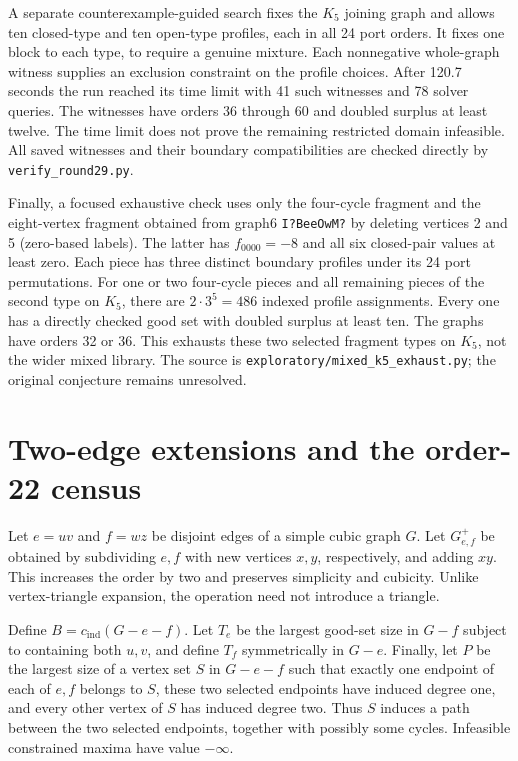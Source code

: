 \documentclass[11pt]{article}
\newcommand{\cind}{c_{\mathrm{ind}}}
\begin{document}
A separate counterexample-guided search fixes the $K_5$ joining
graph and allows ten closed-type and ten open-type profiles, each
in all 24 port orders. It fixes one block to each type, to require
a genuine mixture. Each nonnegative whole-graph witness supplies
an exclusion constraint on the profile choices. After 120.7 seconds
the run reached its time limit with 41 such witnesses and 78 solver
queries. The witnesses have orders 36 through 60 and doubled
surplus at least twelve. The time limit does not prove the remaining
restricted domain infeasible. All saved witnesses and their boundary
compatibilities are checked directly by \texttt{verify\_round29.py}.

Finally, a focused exhaustive check uses only the four-cycle fragment
and the eight-vertex fragment obtained from graph6
\texttt{I?BeeOwM?} by deleting vertices 2 and 5 (zero-based labels).
The latter has $f_{0000}=-8$ and all six closed-pair values at least
zero. Each piece has three distinct boundary profiles under its 24
port permutations. For one or two four-cycle pieces and all remaining
pieces of the second type on $K_5$, there are $2\cdot3^5=486$
indexed profile assignments. Every one has a directly checked good
set with doubled surplus at least ten. The graphs have orders 32 or
36. This exhausts these two selected fragment types on $K_5$, not
the wider mixed library. The source is
\texttt{exploratory/mixed\_k5\_exhaust.py}; the original conjecture
remains unresolved.

\section{Two-edge extensions and the order-22 census}
Let $e=uv$ and $f=wz$ be disjoint edges of a simple cubic graph $G$.
Let $G_{e,f}^{+}$ be obtained by subdividing $e,f$ with new vertices
$x,y$, respectively, and adding $xy$. This increases the order by two
and preserves simplicity and cubicity. Unlike vertex-triangle expansion,
the operation need not introduce a triangle.

Define $B=\cind(G-e-f)$. Let $T_e$ be the largest good-set size in
$G-f$ subject to containing both $u,v$, and define $T_f$ symmetrically
in $G-e$. Finally, let $P$ be the largest size of a vertex set $S$ in
$G-e-f$ such that exactly one endpoint of each of $e,f$ belongs to
$S$, these two selected endpoints have induced degree one, and every
other vertex of $S$ has induced degree two. Thus $S$ induces a path
between the two selected endpoints, together with possibly some cycles.
Infeasible constrained maxima have value $-\infty$.
\end{document}
